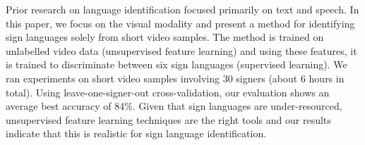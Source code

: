 Prior research on language identification focused primarily on text and speech. In this paper, we focus on the visual modality and present a method for identifying  sign languages solely from short video samples. The method is trained on unlabelled video data (unsupervised feature learning) and using these features, it is trained to discriminate between six  sign languages (supervised learning). We ran experiments on short video samples involving 30 signers (about 6 hours in total). Using leave-one-signer-out cross-validation, our evaluation shows an average best accuracy of 84\%. Given that sign languages are under-resourced, unsupervised feature learning techniques are the right tools and our results indicate that this is realistic for  sign language identification.
